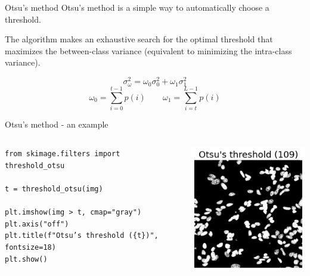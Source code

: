 \documentclass[9pt, aspectratio=169]{beamer}
\begin{document}
\begin{frame}
    {Otsu's method}
    Otsu's method is a simple way to automatically choose a threshold.

    The algorithm makes an exhaustive search for the optimal threshold that maximizes the between-class variance (equivalent to minimizing the intra-class variance).

    \large
    $$\sigma_\omega^2 = \omega_0\sigma_0^2+\omega_1\sigma_1^2$$
    $$\omega_0 =\sum_{i=0}^{t-1} p(i)\qquad\omega_1 =\sum_{i=t}^{L-1} p(i)$$
\end{frame}

\begin{frame}
    {Otsu's method - an example}
    \begin{columns}
        \begin{column}{.6\textwidth}
            \begin{codebox}
                \texttt{from skimage.filters import threshold\_otsu\\
                    \\
                    t = threshold\_otsu(img)\\
                    \\
                    plt.imshow(img > t, cmap="gray")\\
                    plt.axis("off")\\
                    plt.title(f"Otsu's threshold (\{t\})", fontsize=18)\\
                    plt.show()}
            \end{codebox}
        \end{column}
        \begin{column}{.4\textwidth}
            \includegraphics[width=\textwidth]{otsu's threshold.png}
        \end{column}
    \end{columns}
\end{frame}
\end{document}

